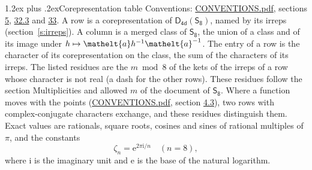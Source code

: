 \documentclass[10pt,a4paper]{article}
\makeatletter
\renewcommand\section{\@startsection{section}{1}{\z@}{-3ex plus -1ex minus -.2ex}%
  {1.2ex plus .2ex}{\normalfont\large\sffamily\bfseries\color{parttitle}}}
\numberwithin{equation}{section}
\newcommand{\eltfont}[1]{{\let\sigma\eltsigma\mathelt{#1}}}
\newcommand{\grp}[1]{\mathsf{#1}}
\newcommand{\elt}[1]{\eltfont{#1}}
\newcommand{\iunit}{\mathrm{i}}
\newcommand{\expe}{\mathrm{e}}
\newcommand{\rootunity}[1]{\zeta_{#1}}
\makeatother
\begin{document}
\section{Corepresentation table}\label{s:character_table}
Conventions: \href{../../CONVENTIONS.pdf}{CONVENTIONS.pdf}, sections \href{../../../rotation/CONVENTIONS.pdf\#conv.5}{5}, \href{../../CONVENTIONS.pdf\#conv.32.3}{32.3} and \href{../../CONVENTIONS.pdf\#conv.33}{33}.
A row is a corepresentation of $\grp{D_{4d}}(\grp{S_{8}})$, named by its irreps (section~\ref{s:irreps}). A column is a merged class of $\grp{S_{8}}$, the union of a class and of its image under $h \mapsto \elt{a} h^{-1} \elt{a}^{-1}$. The entry of a row is the character of its corepresentation on the class, the sum of the characters of its irreps.
\leavevmode\label{n:head.parity}The listed residues are the $m \bmod 8$ of the kets of the irreps of a row whose character is not real (a dash for the other rows). These residues follow the section Multiplicities and allowed $m$ of the document of \href{../../../rotation/data/pdf/S8.pdf}{$\grp{S_{8}}$}. Where a function moves with the points (\href{../../CONVENTIONS.pdf}{CONVENTIONS.pdf}, section \href{../../../rotation/CONVENTIONS.pdf\#conv.4.3}{4.3}), two rows with complex-conjugate characters exchange, and these residues distinguish them.
\leavevmode\label{n:constant.root}\label{n:index.root.order}Exact values are rationals, square roots, cosines and sines of rational multiples of $\pi$, and the constants
\begin{equation}\label{e:constants}\rootunity{n} = \expe^{2\pi\iunit/n}\quad(n = 8),\end{equation}
where $\iunit$ is the imaginary unit and $\expe$ is the base of the natural logarithm.
\end{document}
